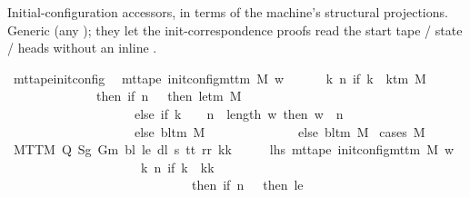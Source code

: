 \begin{isabellebody}
\begin{isamarkuptext}
Initial-configuration accessors, in terms of the machine's
  structural projections.  Generic (any ); they let the
  init-correspondence proofs read the start tape / state / heads
  without an inline .%
\end{isamarkuptext}\isamarkuptrue%
\isamarkupfalse%
\ mt{\isacharunderscore}{\kern0pt}tape{\isacharunderscore}{\kern0pt}init{\isacharunderscore}{\kern0pt}config{\isacharcolon}{\kern0pt}\isanewline
\ \ {\isachardoublequoteopen}mt{\isacharunderscore}{\kern0pt}tape\ {\isacharparenleft}{\kern0pt}init{\isacharunderscore}{\kern0pt}config{\isacharunderscore}{\kern0pt}mttm\ M\ w{\isacharparenright}{\kern0pt}\isanewline
\ \ \ \ \ {\isacharequal}{\kern0pt}\ {\isacharparenleft}{\kern0pt}{\isasymlambda}k\ n{\isachardot}{\kern0pt}\ if\ k\ {\isacharless}{\kern0pt}\ k{\isacharunderscore}{\kern0pt}tm\ M\isanewline
\ \ \ \ \ \ \ \ \ \ \ \ \ \ then\ {\isacharparenleft}{\kern0pt}if\ n\ {\isacharequal}{\kern0pt}\ {}\ then\ le{\isacharunderscore}{\kern0pt}tm\ M\isanewline
\ \ \ \ \ \ \ \ \ \ \ \ \ \ \ \ \ \ \ \ else\ if\ k\ {\isacharequal}{\kern0pt}\ {}\ {\isasymand}\ n\ {\isasymle}\ length\ w\ then\ w\ {\isacharbang}{\kern0pt}\ {\isacharparenleft}{\kern0pt}n\ {\isacharminus}{\kern0pt}\ {}{\isacharparenright}{\kern0pt}\isanewline
\ \ \ \ \ \ \ \ \ \ \ \ \ \ \ \ \ \ \ \ else\ bl{\isacharunderscore}{\kern0pt}tm\ M{\isacharparenright}{\kern0pt}\isanewline
\ \ \ \ \ \ \ \ \ \ \ \ \ \ else\ bl{\isacharunderscore}{\kern0pt}tm\ M{\isacharparenright}{\kern0pt}{\isachardoublequoteclose}\isanewline
%
\isadelimproof
%
\endisadelimproof
%
\isatagproof
{}\isamarkupfalse%
\ {\isacharparenleft}{\kern0pt}cases\ M{\isacharparenright}{\kern0pt}\isanewline
\ \ \isamarkupfalse%
\ {\isacharparenleft}{\kern0pt}MTTM\ Q\ Sg\ Gm\ bl\ le\ dl\ s\ tt\ rr\ kk{\isacharparenright}{\kern0pt}\isanewline
\ \ \isamarkupfalse%
\ \isamarkupfalse%
\ lhs{\isacharcolon}{\kern0pt}\ {\isachardoublequoteopen}mt{\isacharunderscore}{\kern0pt}tape\ {\isacharparenleft}{\kern0pt}init{\isacharunderscore}{\kern0pt}config{\isacharunderscore}{\kern0pt}mttm\ M\ w{\isacharparenright}{\kern0pt}\isanewline
\ \ \ \ \ \ \ \ \ \ \ \ \ \ \ \ \ \ \ \ {\isacharequal}{\kern0pt}\ {\isacharparenleft}{\kern0pt}{\isasymlambda}k\ n{\isachardot}{\kern0pt}\ if\ k\ {\isacharless}{\kern0pt}\ kk\isanewline
\ \ \ \ \ \ \ \ \ \ \ \ \ \ \ \ \ \ \ \ \ \ \ \ \ \ \ \ \ then\ {\isacharparenleft}{\kern0pt}if\ n\ {\isacharequal}{\kern0pt}\ {}\ then\ le\isanewline

\end{isabellebody}
